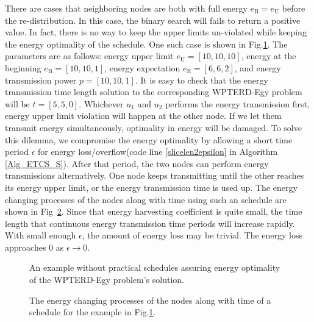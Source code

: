 \documentclass[journal,10pt]{IEEEtran}
\begin{document}
There are cases that neighboring nodes are both with full energy $e_\text{B}{=}e_\text{U}$ before the re-distribution. In this case, the binary search will fails to return a positive value. In fact, there is no way to keep the upper limits un-violated while keeping the energy optimality of the schedule. One such case is shown in Fig.\ref{fig_full}. The parameters are as follows: energy upper limit $e_\text{U}{=}[10,10,10]$, energy at the beginning $e_\text{B}{=}[10,10,1]$, energy expectation $e_\text{E}{=}[6,6,2]$, and energy transmission power $p{=}[10,10,1]$. It is easy to check that the energy transmission time length solution to the corresponding WPTERD-Egy problem will be $t{=}[5,5,0]$. Whichever $u_1$ and $u_2$ performs the energy transmission first, energy upper limit violation will happen at the other node. If we let them transmit energy simultaneously, optimality in energy will be damaged. To solve this dilemma, we compromise the energy optimality by allowing a short time period $\epsilon$ for energy loss/overflow(code line \ref{slicelen2epsilon} in Algorithm \ref{Alg_ETCS_S}). After that period, the two nodes can perform energy transmissions alternatively. One node keeps transmitting until the other reaches its energy upper limit, or the energy transmission time is used up. The energy changing processes of the nodes along with time using such an schedule are shown in Fig~\ref{fig_full_sch}. Since that energy harvesting coefficient is quite small, the time length that continuous energy transmission time periods will increase rapidly. With small enough $\epsilon$, the amount of energy loss may be trivial. The energy loss approaches 0 as $\epsilon{\rightarrow}0$.

\begin{figure}[htb]
\caption{An example without practical schedules assuring energy optimality of the WPTERD-Egy problem's solution.}
\label{fig_full}
\end{figure}

\vspace{-4mm}
\begin{figure}[htb]
\caption{The energy changing processes of the nodes along with time of a schedule for the example in Fig.\ref{fig_full}.}
\label{fig_full_sch}
\end{figure}
\end{document}
